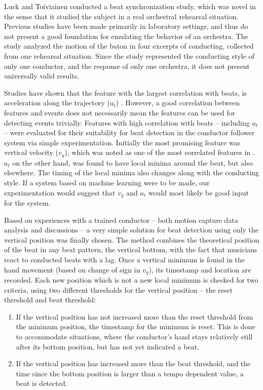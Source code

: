 Luck and Toiviainen \cite{luck2006}
conducted a beat synchronization study,
which was novel in the sense that it studied
the subject in a real orchestral rehearsal situation.
Previous studies have been made primarily in laboratory settings,
and thus do not present a good foundation
for emulating the behavior of an orchestra.
The study analyzed the motion of the baton
in four excerpts of conducting,
collected from one rehearsal situation.
Since the study represented the conducting style of only one conductor,
and the response of only one orchestra,
it does not present universally valid results.

Studies have shown
that the feature with the largest correlation with beats,
is acceleration along the trajectory ($a_t$)
\cite{LuckSloboda2008, LuckSloboda2009}.
However, a good correlation between features and events
does not necessarily mean the features can be used
for detecting events trivially.
Features with high correlation with beats --
including $a_t$ --
were evaluated for their suitability for beat detection
in the conductor follower system
via simple experimentation.
Initially the most promising feature was
vertical velocity ($v_y$),
which was noted as one of the most correlated features in \cite{luck2006}.
$a_t$ on the other hand, was found to have local minima
around the beat, but also elsewhere.
The timing of the local minima also changes along with the conducting style.
If a system based on machine learning were to be made,
our experimentation would suggest that $v_y$ and $a_t$
would most likely be good input for the system.

Based on experiences with a trained conductor --
both motion capture data analysis and discussions --
a very simple solution for beat detection
using only the vertical position was finally chosen.
The method combines the theoretical position of the beat
in any beat pattern, the vertical bottom,
with the fact that musicians react to conducted beats with a lag.
Once a vertical minimum is found in the hand movement
(based on change of sign in $v_y$),
its timestamp and location are recorded.
Each new position which is not a new local minimum
is checked for two criteria,
using two different thresholds for the vertical position --
the reset threshold and beat threshold:
\begin{enumerate}
\item If the vertical position has not increased more than
the reset threshold from the minimum position,
the timestamp for the minimum is reset.
This is done to accommodate situations,
where the conductor's hand stays relatively still after
its bottom position, but has not yet indicated a beat.
\item If the vertical position has increased more
than the beat threshold,
and the time since the bottom position
is larger than a tempo dependent value,
a beat is detected.
\end{enumerate}

